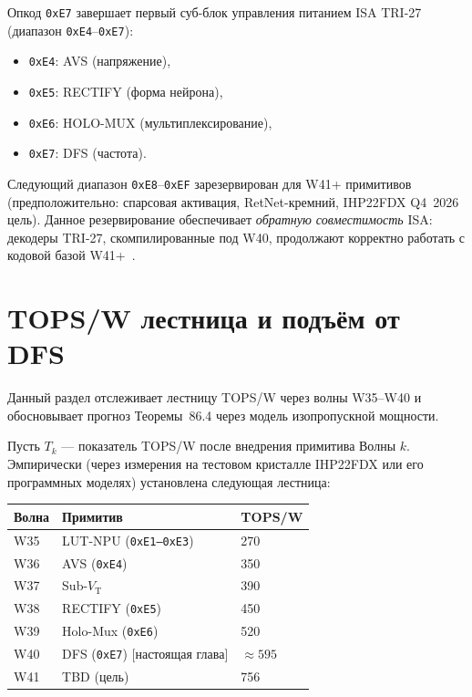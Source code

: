 
Опкод \texttt{0xE7} завершает первый суб-блок управления питанием
ISA TRI-27 (диапазон \texttt{0xE4}--\texttt{0xE7}):
\begin{itemize}
  \item \texttt{0xE4}: AVS (напряжение),
  \item \texttt{0xE5}: RECTIFY (форма нейрона),
  \item \texttt{0xE6}: HOLO-MUX (мультиплексирование),
  \item \texttt{0xE7}: DFS (частота).
\end{itemize}

Следующий диапазон \texttt{0xE8}--\texttt{0xEF} зарезервирован для
W41+ примитивов (предположительно: спарсовая активация, RetNet-кремний,
IHP22FDX Q4~2026 цель).  Данное резервирование обеспечивает \emph{обратную
совместимость} ISA: декодеры TRI-27, скомпилированные под W40, продолжают
корректно работать с кодовой базой W41+~\cite{IEEE-SV-1800-2017}.

\section{TOPS/W лестница и подъём от DFS}
\label{sec:glava86-tops-w}

Данный раздел отслеживает лестницу TOPS/W через волны W35--W40
и обосновывает прогноз Теоремы~86.4 через модель изопропускной мощности.


\begin{definition}
\label{def:tops-w-ladder}
Пусть $T_k$ — показатель TOPS/W после внедрения примитива Волны $k$.
Эмпирически (через измерения на тестовом кристалле IHP22FDX или его
программных моделях) установлена следующая лестница:
\begin{center}
\begin{tabular}{lll}
\hline
Волна & Примитив & TOPS/W \\
\hline
W35 & LUT-NPU (\texttt{0xE1--0xE3})           & 270 \\
W36 & AVS (\texttt{0xE4})~\cite{t27655}       & 350 \\
W37 & Sub-$V_{\mathrm{T}}$~\cite{t27660}      & 390 \\
W38 & RECTIFY (\texttt{0xE5})~\cite{t27661}   & 450 \\
W39 & Holo-Mux (\texttt{0xE6})~\cite{t27665}  & 520 \\
W40 & DFS (\texttt{0xE7}) [настоящая глава]   & $\approx 595$ \\
W41 & TBD (цель)                               & 756 \\
\hline
\end{tabular}
\end{center}
\end{definition}

